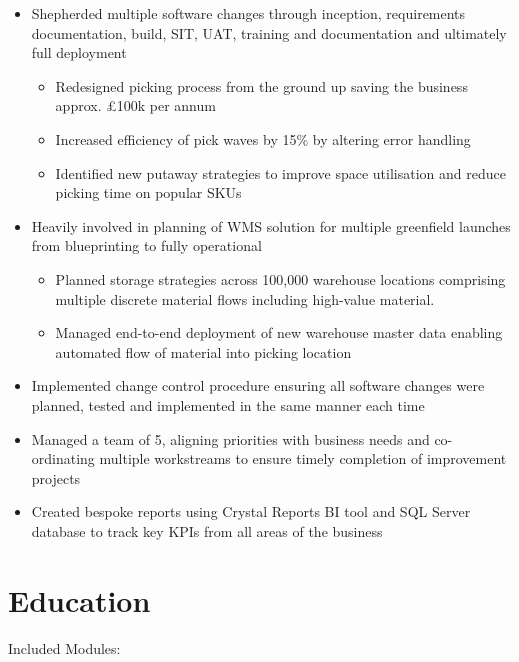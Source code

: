 \documentclass[11pt,a4paper]{moderncv}
\begin{document}
\begin{itemize}
\item Shepherded multiple software changes through inception, requirements documentation, build, SIT, UAT, training and documentation and ultimately full deployment
\begin{itemize}
    \item Redesigned picking process from the ground up saving the business approx. £100k per annum
    \item Increased efficiency of pick waves by 15\% by altering error handling
    \item Identified new putaway strategies to improve space utilisation and reduce picking time on popular SKUs
\end{itemize}
\item Heavily involved in planning of WMS solution for multiple greenfield launches from blueprinting to fully operational
\begin{itemize}
    \item Planned storage strategies across 100,000 warehouse locations comprising multiple discrete material flows including high-value material.
    \item Managed end-to-end deployment of new warehouse master data enabling automated flow of material into picking location
\end{itemize}
\item Implemented change control procedure ensuring all software changes were planned, tested and implemented in the same manner each time
\item Managed a team of 5, aligning priorities with business needs and co-ordinating multiple workstreams to ensure timely completion of improvement projects
\item Created bespoke reports using Crystal Reports BI tool and SQL Server database to track key KPIs from all areas of the business
\end{itemize}
\section{Education}
Included Modules:%

\end{document}
